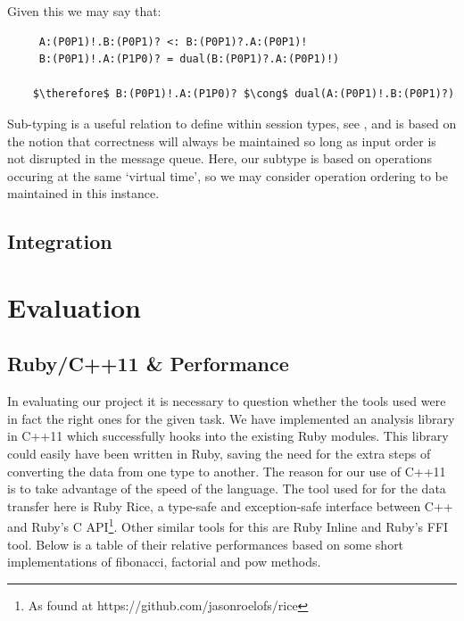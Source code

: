 \documentclass[11pt, abstracton, twoside]{scrartcl}
\def\therefore{
	\leavevmode
	\lower0.4ex\hbox{$\cdot$}
	\kern-.5em\raise0.7ex\hbox{$\cdot$}
	\kern-0.55em\lower0.4ex\hbox{$\cdot$}
	\thinspace
}
\begin{document}
Given this we may say that:
\\
\begin{lstlisting}
     A:(P0P1)!.B:(P0P1)? <: B:(P0P1)?.A:(P0P1)!
     B:(P0P1)!.A:(P1P0)? = dual(B:(P0P1)?.A:(P0P1)!)

    $\therefore$ B:(P0P1)!.A:(P1P0)? $\cong$ dual(A:(P0P1)!.B:(P0P1)?)
\end{lstlisting}

Sub-typing is a useful relation to define within session types, see 
\cite{HYC08, MY15, MYH09}, and is based on the notion that correctness will 
always be maintained so long as input order is not disrupted in the message 
queue. Here, our subtype is based on operations occuring at the same `virtual 
time', so we may consider operation ordering to be maintained in this instance. 

\subsection{Integration}



\newpage

\section{Evaluation}
\thispagestyle{empty}
\subsection{Ruby/C++11 \& Performance}
In evaluating our project it is necessary to question whether the tools used were
in fact the right ones for the given task. We have implemented an analysis library
in C++11 which successfully hooks into the existing Ruby modules. This library
could easily have been written in Ruby, saving the need for the extra steps
of converting the data from one type to another. The reason for our
use of C++11 is to take advantage of the speed of the language. The tool used for
for the data transfer here is Ruby Rice, a type-safe and exception-safe interface
between C++ and Ruby's C API\footnote{As found at https://github.com/jasonroelofs/rice}.
Other similar tools for this are Ruby Inline and Ruby's FFI tool. Below is a table
of their relative performances based on some short implementations of fibonacci, 
factorial and pow methods.
\end{document}
